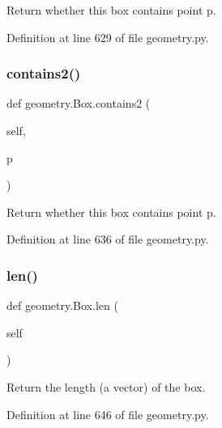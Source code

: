 \begin{DoxyVerb}Return whether this box contains point p.\end{DoxyVerb}
 

Definition at line 629 of file geometry.\+py.

\mbox{\label{classgeometry_1_1Box_af22304a33ca2c58b7ca21427608602e0}} 
\subsubsection{\texorpdfstring{contains2()}{contains2()}}
{\footnotesize\ttfamily def geometry.\+Box.\+contains2 (\begin{DoxyParamCaption}\item[{}]{self,  }\item[{}]{p }\end{DoxyParamCaption})}

\begin{DoxyVerb}Return whether this box contains point p.\end{DoxyVerb}
 

Definition at line 636 of file geometry.\+py.

\mbox{\label{classgeometry_1_1Box_af876b4d7ab7286682103a064e96f43d6}} 
\subsubsection{\texorpdfstring{len()}{len()}}
{\footnotesize\ttfamily def geometry.\+Box.\+len (\begin{DoxyParamCaption}\item[{}]{self }\end{DoxyParamCaption})}

\begin{DoxyVerb}Return the length (a vector) of the box.\end{DoxyVerb}
 

Definition at line 646 of file geometry.\+py.

\mbox{\label{classgeometry_1_1Box_af671baed782da60af8058570b2f6bfa9}} 
